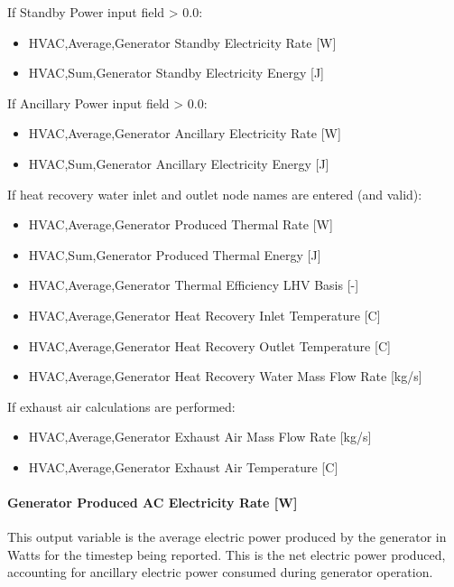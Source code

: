 If Standby Power input field \textgreater{} 0.0:

\begin{itemize}
\item
  HVAC,Average,Generator Standby Electricity Rate {[}W{]}
\item
  HVAC,Sum,Generator Standby Electricity Energy {[}J{]}
\end{itemize}

If Ancillary Power input field \textgreater{} 0.0:

\begin{itemize}
\item
  HVAC,Average,Generator Ancillary Electricity Rate {[}W{]}
\item
  HVAC,Sum,Generator Ancillary Electricity Energy {[}J{]}
\end{itemize}

If heat recovery water inlet and outlet node names are entered (and valid):

\begin{itemize}
\item
  HVAC,Average,Generator Produced Thermal Rate {[}W{]}
\item
  HVAC,Sum,Generator Produced Thermal Energy {[}J{]}
\item
  HVAC,Average,Generator Thermal Efficiency LHV Basis {[}-{]}
\item
  HVAC,Average,Generator Heat Recovery Inlet Temperature {[}C{]}
\item
  HVAC,Average,Generator Heat Recovery Outlet Temperature {[}C{]}
\item
  HVAC,Average,Generator Heat Recovery Water Mass Flow Rate {[}kg/s{]}
\end{itemize}

If exhaust air calculations are performed:

\begin{itemize}
\item
  HVAC,Average,Generator Exhaust Air Mass Flow Rate {[}kg/s{]}
\item
  HVAC,Average,Generator Exhaust Air Temperature {[}C{]}
\end{itemize}

\paragraph{Generator Produced AC Electricity Rate {[}W{]}}\label{generator-produced-electric-power-w-1}

This output variable is the average electric power produced by the generator in Watts for the timestep being reported. This is the net electric power produced, accounting for ancillary electric power consumed during generator operation.


